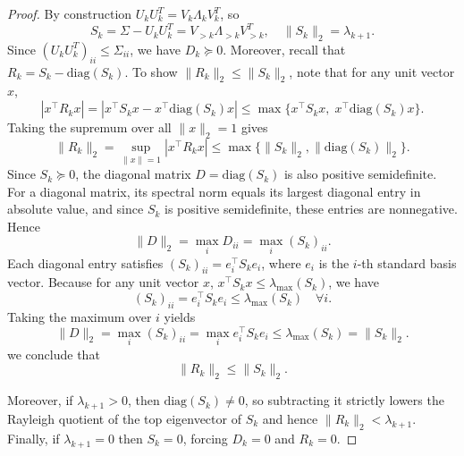 \documentclass[10pt,a4paper]{amsart}
\providecommand{\diag}{\mathrm{diag}}
\begin{document}
\begin{proof}
By construction \(U_kU_k^T=V_k\Lambda_kV_k^T\), so 
\[
S_k=\Sigma-U_kU_k^T=V_{>k}\Lambda_{>k}V_{>k}^T,\quad
\|S_k\|_2=\lambda_{k+1}.
\]
Since \((U_kU_k^T)_{ii}\le\Sigma_{ii}\), we have \(D_k\succeq0\).  
Moreover, recall that \(R_k = S_k - \diag(S_k)\).  
To show \(\|R_k\|_2 \le \|S_k\|_2\), note that for any unit vector \(x\),
\[
|x^\top R_k x| = |x^\top S_k x - x^\top \diag(S_k) x|
  \le \max\{x^\top S_k x,\; x^\top \diag(S_k) x\}.
\]
Taking the supremum over all \(\|x\|_2=1\) gives
\[
\|R_k\|_2 = \sup_{\|x\|=1} |x^\top R_k x|
   \le \max\{\|S_k\|_2,\|\diag(S_k)\|_2\}.
\]
Since \(S_k \succeq 0\), the diagonal matrix \(D = \diag(S_k)\) is also positive semidefinite.  
For a diagonal matrix, its spectral norm equals its largest diagonal entry in absolute value, and since \(S_k\) is positive semidefinite, these entries are nonnegative. Hence
\[
\|D\|_2 = \max_i D_{ii} = \max_i (S_k)_{ii}.
\]
Each diagonal entry satisfies \((S_k)_{ii} = e_i^\top S_k e_i\), where \(e_i\) is the \(i\)-th standard basis vector.  
Because for any unit vector \(x\), \(x^\top S_k x \le \lambda_{\max}(S_k)\), we have
\[
(S_k)_{ii} = e_i^\top S_k e_i \le \lambda_{\max}(S_k) \quad \forall i.
\]
Taking the maximum over \(i\) yields
\[
\|D\|_2 = \max_i (S_k)_{ii} = \max_i e_i^\top S_k e_i \le \lambda_{\max}(S_k) = \|S_k\|_2.
\]
we conclude that
\[
\|R_k\|_2 \le \|S_k\|_2.
\]

Moreover, if \(\lambda_{k+1}>0\), then \(\diag(S_k)\neq0\), so subtracting it strictly lowers the Rayleigh quotient of the top eigenvector of \(S_k\) and hence \(\|R_k\|_2<\lambda_{k+1}\).  Finally, if \(\lambda_{k+1}=0\) then \(S_k=0\), forcing \(D_k=0\) and \(R_k=0\).
\end{proof}
\end{document}
